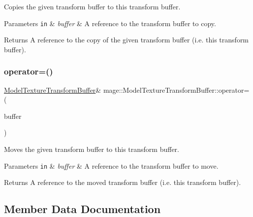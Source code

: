 Copies the given transform buffer to this transform buffer.


\begin{DoxyParams}[1]{Parameters}
\mbox{\tt in}  & {\em buffer} & A reference to the transform buffer to copy. \\
\hline
\end{DoxyParams}
\begin{DoxyReturn}{Returns}
A reference to the copy of the given transform buffer (i.\+e. this transform buffer). 
\end{DoxyReturn}
\hypertarget{structmage_1_1_model_texture_transform_buffer_a025ad62973c7ae20b8e977f94c509a54}{}\label{structmage_1_1_model_texture_transform_buffer_a025ad62973c7ae20b8e977f94c509a54} 
\subsubsection{\texorpdfstring{operator=()}{operator=()}\hspace{0.1cm}{\footnotesize\ttfamily [2/2]}}
{\footnotesize\ttfamily \hyperlink{structmage_1_1_model_texture_transform_buffer}{Model\+Texture\+Transform\+Buffer}\& mage\+::\+Model\+Texture\+Transform\+Buffer\+::operator= (\begin{DoxyParamCaption}\item[{\hyperlink{structmage_1_1_model_texture_transform_buffer}{Model\+Texture\+Transform\+Buffer} \&\&}]{buffer }\end{DoxyParamCaption})\hspace{0.3cm}{\ttfamily [default]}}

Moves the given transform buffer to this transform buffer.


\begin{DoxyParams}[1]{Parameters}
\mbox{\tt in}  & {\em buffer} & A reference to the transform buffer to move. \\
\hline
\end{DoxyParams}
\begin{DoxyReturn}{Returns}
A reference to the moved transform buffer (i.\+e. this transform buffer). 
\end{DoxyReturn}


\subsection{Member Data Documentation}
\hypertarget{structmage_1_1_model_texture_transform_buffer_adb5e9e5b5d8c48267f0947c1ebc67b27}{}\label{structmage_1_1_model_texture_transform_buffer_adb5e9e5b5d8c48267f0947c1ebc67b27} 
